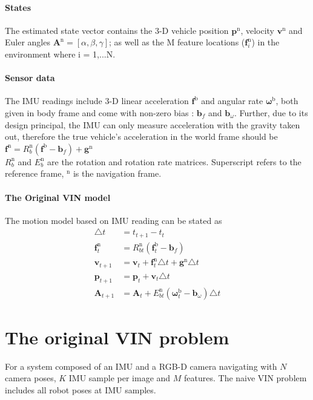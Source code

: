\documentclass[12pt]{article}   %
\begin{document}
\paragraph{States}
The estimated state vector contains the 3-D vehicle position $\bm{p}^{\mathrm{n}}$, velocity $\bm{v}^{\mathrm{n}}$ and Euler angles $\bm{A}^{\mathrm{n}}=[\alpha,\beta,\gamma]$; as well as the M feature locations ($\bm{f}_i^{\mathrm{n}}$) in the environment where i = 1,...N. 
\paragraph{Sensor data}
The IMU readings include 3-D linear acceleration $\bm{f}^{\mathrm{b}}$ and angular rate $\bm{\omega}^{\mathrm{b}}$, both given in body frame and come with non-zero bias : $\bm{b}_f$ and $\bm{b}_\omega$. \newline
Further, due to its design principal, the IMU can only measure acceleration with the gravity taken out, therefore the true vehicle's acceleration in the world frame should be \\
$\bm{f}^{\mathrm{n}} = R_b^{\mathrm{n}}( \bm{f}^{\mathrm{b}}-\bm{b}_f ) + \bm{g}^{\mathrm{n}}$ \\
$R_b^{\mathrm{n}}$ and $E_b^{\mathrm{n}}$ are the rotation and rotation rate matrices.
Superscript refers to the reference frame, ${}^{\mathrm{n}}$ is the navigation frame.

\paragraph{The Original VIN model}
The motion model based on IMU reading can be stated as
\begin{align*}
	\triangle t & =  t_{t+1} - t_t \\
	\bm{f}_t^{\mathrm{n}} & = R_{bt}^{\mathrm{n}}  (\bm{f}_t^{\mathrm{b}} - \bm{b}_f) \\
	\bm{v}_{t+1} & = \bm{v}_{t} + \bm{f}_t^{\mathrm{n}} \triangle t + \bm{g}^{\mathrm{n}} \triangle t \\
	\bm{p}_{t+1} & = \bm{p}_{t} + \bm{v}_t \triangle t \\
	\bm{A}_{t+1} & = \bm{A}_t + E_{bt}^{\mathrm{n}}  (\bm{\omega}_t^{\mathrm{b}} - \bm{b}_\omega) \triangle t
\end{align*}

\section{The original VIN problem}
For a system composed of an IMU and a RGB-D camera navigating with $N$ camera poses, $K$ IMU sample per image and $M$ features. The naive VIN problem includes all robot poses at IMU samples.
\end{document}
